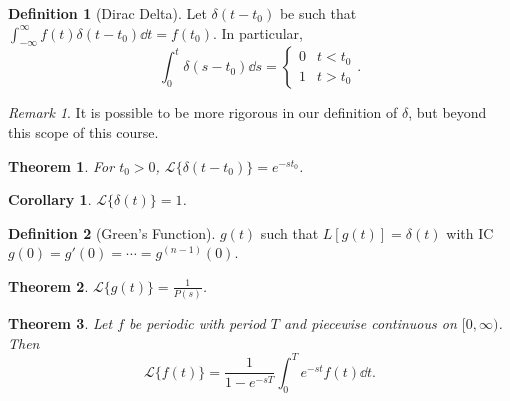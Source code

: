 \documentclass[12pt, oneside]{article}
\newcommand{\laplace}[1]{\mathcal{L}\{#1\}}
\theoremstyle{definition}
\newtheorem{defn}{Definition}
\theoremstyle{plain}
\newtheorem{thm}{Theorem}
\newtheorem{cor}{Corollary}
\theoremstyle{remark}
\newtheorem{remark}{Remark}
\begin{document}
\begin{defn}[Dirac Delta]
  Let $\delta(t - t_0)$ be such that $\int_{-\infty}^\infty f(t) \delta(t - t_0) \dd{t} = f(t_0)$. In particular, \[
  \int_0^t \delta(s - t_0) \dd{s} = \begin{cases}
    0 & t < t_0\\
    1 & t > t_0
  \end{cases}  .
  \]
\end{defn}

\begin{remark}
  It is possible to be more rigorous in our definition of $\delta$, but beyond this scope of this course.
\end{remark}

\begin{thm}
  For $t_0 > 0$, $\laplace{\delta(t - t_0)} = e^{-st_0}$.
\end{thm}

\begin{cor}
  $\laplace{\delta(t)} = 1$.
\end{cor}
\begin{defn}[Green's Function]
  $g(t)$ such that $L[g(t)] = \delta(t)$ with IC $g(0) = g'(0) = \cdots=  g^{(n-1)}(0)$.
\end{defn}
\begin{thm}
  $\laplace{g(t)} = \frac{1}{P(s)}$.
\end{thm}

\begin{thm}
  Let $f$ be periodic with period $T$ and piecewise continuous on $[0, \infty)$. Then \[
  \laplace{f(t)}   = \frac{1}{1 - e^{-sT}}\int_0^T e^{-st} f(t) \dd{t}.
  \]
\end{thm}
\end{document}
